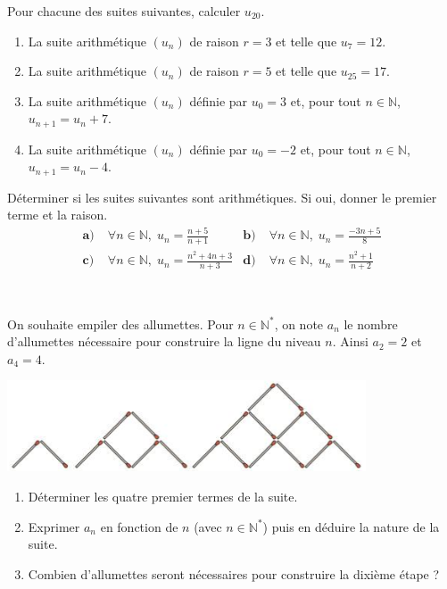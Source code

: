 \documentclass[11pt]{article}
\begin{document}
\begin{exo}
  Pour chacune des suites suivantes, calculer $u_{20}$.
  \begin{enumerate}
    \item La suite arithmétique $\left( u_n \right)$ de raison $r=3$ et telle
      que $u_7=12$.
    \item La suite arithmétique $\left( u_n \right)$ de raison $r=5$ et telle
      que $u_{25}=17$.
    \item La suite arithmétique $\left( u_n \right)$ définie par $u_0=3$ et,
      pour tout $n\in\mathbb{N}$, $u_{n+1}=u_n+7$.
    \item La suite arithmétique $\left( u_n \right)$ définie par $u_0=-2$ et,
      pour tout $n\in\mathbb{N}$, $u_{n+1}=u_n-4$.
  \end{enumerate}
\end{exo}

\begin{exo}
  Déterminer si les suites suivantes sont arithmétiques. Si oui, donner le
  premier terme et la raison.
  \begin{align*}
    \textbf{a)}\;& \forall n\in\mathbb{N},\; u_n = \frac{n+5}{n+1} &
    \textbf{b)}\;& \forall n\in\mathbb{N},\; u_n = \frac{-3n+5}{8} \\
    \textbf{c)}\;& \forall n\in\mathbb{N},\; u_n = \frac{n^2+4n+3}{n+3} &
    \textbf{d)}\;& \forall n\in\mathbb{N},\; u_n = \frac{n^2+1}{n+2}
  \end{align*}
\end{exo}

\begin{exo}~\\
  \begin{minipage}[]{.5\textwidth}
    On souhaite empiler des allumettes. Pour $n\in\mathbb{N}^*$, on note $a_n$
    le nombre d'allumettes nécessaire pour construire la ligne du niveau $n$.
    Ainsi $a_2=2$ et $a_4=4$.
  \end{minipage}
  \begin{minipage}[]{.5\textwidth}
    \begin{center}
      \includegraphics[scale=.6]{matches.png}
    \end{center}
  \end{minipage}
  \begin{enumerate}
      \item Déterminer les quatre premier termes de la suite.
      \item Exprimer $a_n$ en fonction de $n$ (avec $n\in\mathbb{N}^*$) puis en
        déduire la nature de la suite.
      \item Combien d'allumettes seront nécessaires pour construire la dixième
        étape ?
  \end{enumerate}
\end{exo}
\end{document}
